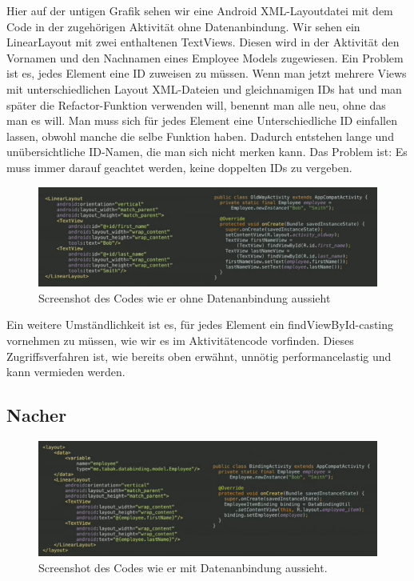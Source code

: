 \documentclass[a4paper,12pt]{article}
\begin{document}
Hier auf der untigen Grafik sehen wir eine Android XML-Layoutdatei mit dem Code in der zugehörigen Aktivität ohne Datenanbindung. Wir sehen ein LinearLayout mit zwei enthaltenen TextViews. Diesen wird in der Aktivität den Vornamen und den Nachnamen eines Employee Models zugewiesen. Ein Problem ist es, jedes Element eine ID zuweisen zu müssen. Wenn man jetzt mehrere Views mit unterschiedlichen Layout XML-Dateien und gleichnamigen IDs hat und man später die Refactor-Funktion verwenden will, benennt man alle neu, ohne das man es will. Man muss sich für jedes Element eine Unterschiedliche ID einfallen lassen, obwohl manche die selbe Funktion haben. Dadurch entstehen lange und unübersichtliche ID-Namen, die man sich nicht merken kann. Das Problem ist: Es muss immer darauf geachtet werden, keine doppelten IDs zu vergeben.\\

\begin{figure}[h]
\centering
\includegraphics[scale=0.45]{img/DataBinding_vorher}
\caption{Screenshot des Codes wie er ohne Datenanbindung aussieht}
\end{figure}

Ein weitere Umständlichkeit ist es, für jedes Element ein findViewById-casting vornehmen zu müssen, wie wir es im Aktivitätencode vorfinden. Dieses Zugriffsverfahren ist, wie bereits oben erwähnt, unnötig performancelastig und kann vermieden werden.
\subsection{Nacher}

\begin{figure}[h]
\centering
\includegraphics[scale=0.45]{img/DataBinding_nacher}
\caption{Screenshot des Codes wie er mit Datenanbindung aussieht.}
\end{figure}
\end{document}
